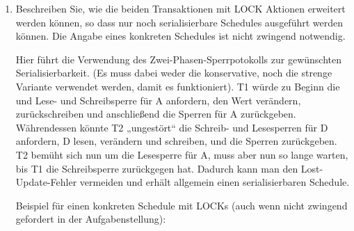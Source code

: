 \documentclass{bschlangaul-aufgabe}
\begin{document}
\begin{enumerate}

\item Beschreiben Sie, wie die beiden Transaktionen mit LOCK Aktionen
erweitert werden können, so dass nur noch serialisierbare Schedules
ausgeführt werden können. Die Angabe eines konkreten Schedules ist nicht
zwingend notwendig.

\begin{bAntwort}
Hier führt die Verwendung des Zwei-Phasen-Sperrpotokolls zur gewünschten
Serialisierbarkeit. (Es muss dabei weder die konservative, noch die
strenge Variante verwendet werden, damit es funktioniert). T1 würde zu
Beginn die und Lese- und Schreibsperre für A anfordern, den Wert
verändern, zurückschreiben und anschließend die Sperren für A
zurückgeben. Währendessen könnte T2 „ungestört“ die Schreib- und
Lesesperren für D anfordern, D lesen, verändern und schreiben, und die
Sperren zurückgeben. T2 bemüht sich nun um die Lesesperre für A, muss
aber nun so lange warten, bis T1 die Schreibsperre zurückgegen hat.
Dadurch kann man den Lost-Update-Fehler vermeiden und erhält allgemein
einen serialisierbaren Schedule.

Beispiel für einen konkreten Schedule mit LOCKs (auch wenn nicht
zwingend gefordert in der Aufgabenstellung):


\end{bAntwort}
\end{enumerate}
\end{document}
